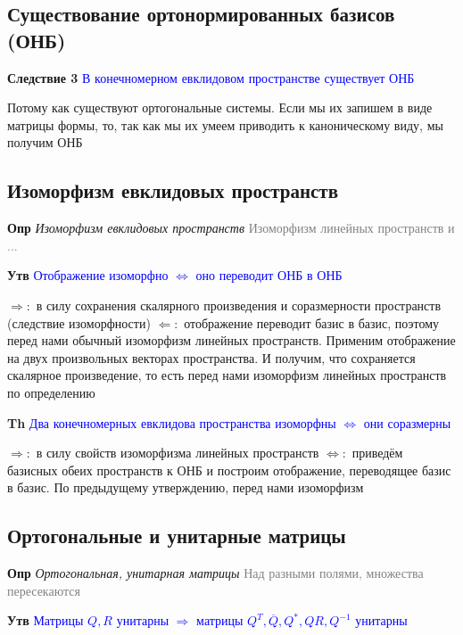 \documentclass[a4paper, 14pt]{article}
\begin{document}
    \subsection{Существование ортонормированных базисов (ОНБ)}
    
    \textbf{Следствие 3} \textcolor{blue}{В конечномерном евклидовом пространстве существует ОНБ}
    
    Потому как существуют ортогональные системы.
    Если мы их запишем в виде матрицы формы, то, так как мы их умеем приводить к каноническому виду, мы получим ОНБ
    
    \subsection{Изоморфизм евклидовых пространств}
    
    \textbf{Опр} \textit{Изоморфизм евклидовых пространств} \textcolor{gray}{Изоморфизм линейных пространств и ...}
    
    \textbf{Утв} \textcolor{blue}{Отображение изоморфно $\Leftrightarrow$ оно переводит ОНБ в ОНБ}
    
    $\Rightarrow:$ в силу сохранения скалярного произведения и соразмерности пространств (следствие изоморфности)
    $\Leftarrow:$ отображение переводит базис в базис, поэтому перед нами обычный изоморфизм линейных
    пространств.
    Применим отображение на двух произвольных векторах пространства.
    И получим, что сохраняется скалярное произведение, то есть перед нами изоморфизм линейных пространств по определению
    
    \textbf{Th} \textcolor{blue}{Два конечномерных евклидова пространства изоморфны $\Leftrightarrow$ они соразмерны}
    
    $\Rightarrow:$ в силу свойств изоморфизма линейных пространств
    $\Leftrightarrow:$ приведём базисных обеих пространств к ОНБ и построим отображение, переводящее базис в базис.
    По предыдущему утверждению, перед нами изоморфизм
    
    \subsection{Ортогональные и унитарные матрицы}
    
    \textbf{Опр} \textit{Ортогональная, унитарная матрицы} \textcolor{gray}{Над разными полями, множества пересекаются}
    
    \textbf{Утв} \textcolor{blue}{Матрицы $Q, R$ унитарны $\Rightarrow$ матрицы $Q^T, \overline{Q}, Q^*, QR, Q^{-1}$
        унитарны}
    
\end{document}

